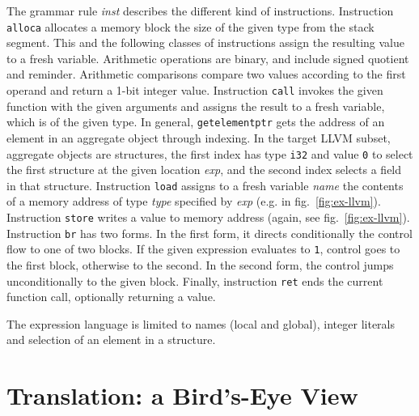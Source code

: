 \documentclass{llncs}
\newcommand{\llvm}[1]{\texttt{#1}}
\newcommand{\nt}[1]{{\normalfont\textit{#1}}}
\begin{document}
The grammar rule \nt{inst} describes the different kind of
instructions. Instruction \llvm{alloca} allocates a memory block the size of the
given type from the stack segment. This and the following classes of
instructions assign the resulting value to a fresh variable. Arithmetic
operations are binary, and include signed quotient and reminder. Arithmetic
comparisons compare two values according to the first operand and return a 1-bit
integer value.  Instruction \llvm{call} invokes the given function with the
given arguments and assigns the result to a fresh variable, which is of the
given type.  In general, \llvm{getelementptr} gets the address of an element in
an aggregate object through indexing. In the target LLVM subset, aggregate
objects are structures, the first index has type \llvm{i32} and value \llvm{0}
to select the first structure at the given location \nt{exp}, and the second
index selects a field in that structure.  Instruction \llvm{load} assigns to a
fresh variable \nt{name} the contents of a memory address of type \nt{type}
specified by \nt{exp} (e.g. in fig.~\ref{fig:ex-llvm}).  Instruction
\llvm{store} writes a value to memory address (again, see
fig.~\ref{fig:ex-llvm}).  Instruction \llvm{br} has two forms.  In the first
form, it directs conditionally the control flow to one of two blocks.  If the
given expression evaluates to \llvm{1}, control goes to the first block,
otherwise to the second. In the second form, the control jumps unconditionally
to the given block.
Finally, instruction \llvm{ret}
ends the current function call, optionally returning a value.

The expression language is limited to names (local and global), integer literals
and selection of an element in a structure.

\section{Translation: a Bird's-Eye View}
\label{sec:overview}
\end{document}
